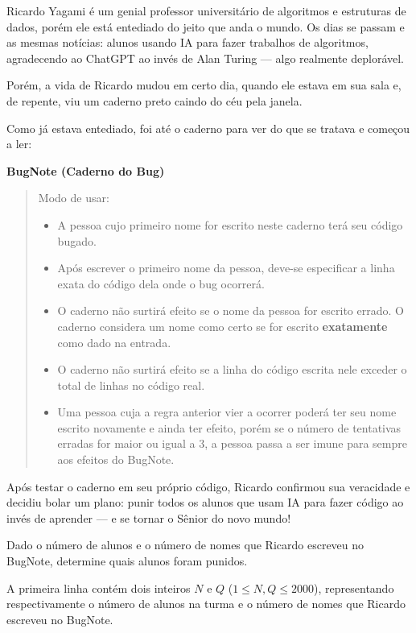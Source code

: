 
Ricardo Yagami é um genial professor universitário de algoritmos e estruturas de dados, porém ele está entediado do jeito que anda o mundo.  
Os dias se passam e as mesmas notícias: alunos usando IA para fazer trabalhos de algoritmos, agradecendo ao ChatGPT ao invés de Alan Turing — algo realmente deplorável.

Porém, a vida de Ricardo mudou em certo dia, quando ele estava em sua sala e, de repente, viu um caderno preto caindo do céu pela janela.  

Como já estava entediado, foi até o caderno para ver do que se tratava e começou a ler:

\begin{center}
\textbf{BugNote (Caderno do Bug)}\\
\end{center}

\begin{quote}
Modo de usar:
\begin{itemize}
  \item A pessoa cujo primeiro nome for escrito neste caderno terá seu código bugado.
  \item Após escrever o primeiro nome da pessoa, deve-se especificar a linha exata do código dela onde o bug ocorrerá.
  \item O caderno não surtirá efeito se o nome da pessoa for escrito errado. O caderno considera um nome como certo se for escrito \textbf{exatamente} como dado na entrada.
  \item O caderno não surtirá efeito se a linha do código escrita nele exceder o total de linhas no código real.
  \item Uma pessoa cuja a regra anterior vier a ocorrer poderá ter seu nome escrito novamente e ainda ter efeito, porém se o número de tentativas erradas for maior ou igual a $3$, a pessoa passa a ser imune para sempre aos efeitos do BugNote.
\end{itemize}
\end{quote}

Após testar o caderno em seu próprio código, Ricardo confirmou sua veracidade e decidiu bolar um plano: punir todos os alunos que usam IA para fazer código ao invés de aprender — e se tornar o Sênior do novo mundo!

Dado o número de alunos e o número de nomes que Ricardo escreveu no BugNote, determine quais alunos foram punidos.

A primeira linha contém dois inteiros $N$ e $Q$ ($1 \leq N, Q \leq 2000$), representando respectivamente o número de alunos na turma e o número de nomes que Ricardo escreveu no BugNote.


